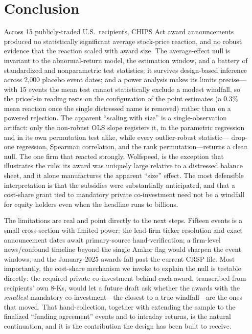 \documentclass[12pt]{article}
\begin{document}
\section{Conclusion}\label{sec:concl}
Across 15 publicly-traded U.S.\ recipients, CHIPS Act award announcements produced no
statistically significant average stock-price reaction, and no robust evidence that the
reaction scaled with award size. The average-effect null is invariant to the abnormal-return
model, the estimation window, and a battery of standardized and nonparametric test statistics; it
survives design-based inference across 2{,}000 placebo event dates; and a power analysis makes its
limits precise---with 15 events the mean test cannot statistically exclude a modest windfall, so the
priced-in reading rests on the configuration of the point estimates (a $0.3\%$ mean reaction once
the single distressed name is removed) rather than on a powered rejection. The apparent ``scaling with
size'' is a single-observation artifact: only the non-robust OLS slope registers it, in the
parametric regression and in its own permutation test alike, while every outlier-robust statistic---
drop-one regression, Spearman correlation, and the rank permutation---returns a clean null. The one
firm that reacted strongly, Wolfspeed, is the exception that illustrates the rule: its award was
uniquely large relative to a distressed balance sheet, and it alone manufactures the apparent
``size'' effect. The most defensible interpretation is that the subsidies were substantially
anticipated, and that a cost-share grant tied to mandatory private co-investment need not be a
windfall for equity holders even when the headline runs to billions.

The limitations are real and point directly to the next steps. Fifteen events is a small
cross-section with limited power; the lead-firm ticker resolution and exact announcement dates
await primary-source hand-verification; a firm-level news/confound timeline beyond the single Amkor
flag would sharpen the event windows; and the January-2025 awards fall past the current CRSP file.
Most importantly, the cost-share mechanism we invoke to explain the null is testable directly: the
required private co-investment behind each award, transcribed from recipients' own 8-Ks, would let a
future draft ask whether the awards with the \emph{smallest} mandatory co-investment---the closest
to a true windfall---are the ones that moved. That hand-collection, together with extending the
sample to the finalized ``funding agreement'' events and to intraday returns, is the natural
continuation, and it is the contribution the design has been built to receive.
\end{document}
